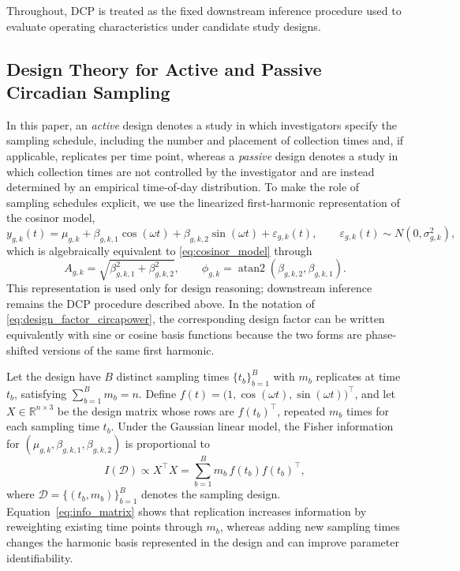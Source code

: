 \documentclass{article}
\begin{document}
Throughout, DCP is treated as the fixed downstream inference procedure used to
evaluate operating characteristics under candidate study designs.

\subsection{Design Theory for Active and Passive Circadian Sampling}
\label{sec:design_theory}

In this paper, an \emph{active} design denotes a study in which investigators
specify the sampling schedule, including the number and placement of collection
times and, if applicable, replicates per time point, whereas a \emph{passive}
design denotes a study in which collection times are not controlled by the
investigator and are instead determined by an empirical time-of-day distribution. To make the role of sampling schedules explicit, we use the linearized
first-harmonic representation of the cosinor model,
\begin{equation}
y_{g,k}(t)
=
\mu_{g,k}
+
\beta_{g,k,1}\cos(\omega t)
+
\beta_{g,k,2}\sin(\omega t)
+
\varepsilon_{g,k}(t),
\qquad
\varepsilon_{g,k}(t)\sim N(0,\sigma_{g,k}^2),
\label{eq:cosinor_linear}
\end{equation}
which is algebraically equivalent to \eqref{eq:cosinor_model} through
\begin{equation}
A_{g,k}=\sqrt{\beta_{g,k,1}^2+\beta_{g,k,2}^2},
\qquad
\phi_{g,k}=\operatorname{atan2}\!\left(\beta_{g,k,2},\beta_{g,k,1}\right).
\label{eq:beta_to_phase}
\end{equation}
This representation is used only for design reasoning; downstream inference
remains the DCP procedure described above. In the notation of
\eqref{eq:design_factor_circapower}, the corresponding design factor can be
written equivalently with sine or cosine basis functions because the two forms
are phase-shifted versions of the same first harmonic.

Let the design have $B$ distinct sampling times $\{t_b\}_{b=1}^B$ with $m_b$
replicates at time $t_b$, satisfying $\sum_{b=1}^B m_b=n$. Define
$f(t)=\bigl(1,\cos(\omega t),\sin(\omega t)\bigr)^\top$, and let
$X\in\mathbb{R}^{n\times 3}$ be the design matrix whose rows are $f(t_b)^\top$,
repeated $m_b$ times for each sampling time $t_b$. Under the Gaussian linear
model, the Fisher information for $(\mu_{g,k},\beta_{g,k,1},\beta_{g,k,2})$ is
proportional to
\begin{equation}
I(\mathcal{D}) \propto X^\top X
=
\sum_{b=1}^B m_b\, f(t_b)f(t_b)^\top,
\label{eq:info_matrix}
\end{equation}
where $\mathcal{D}=\{(t_b,m_b)\}_{b=1}^B$ denotes the sampling design.
Equation~\eqref{eq:info_matrix} shows that replication increases information by
reweighting existing time points through $m_b$, whereas adding new sampling
times changes the harmonic basis represented in the design and can improve
parameter identifiability.
\end{document}
